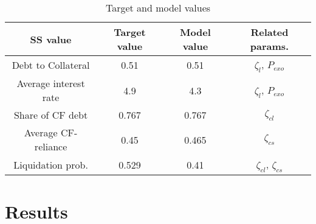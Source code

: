 \documentclass[12pt]{article}
\begin{document}
\begin{table}[h!]
    \centering
    \begin{tabular}{c|c|c|c}
    \toprule
    \textbf{SS value} & \textbf{Target value} & \textbf{Model value} & \textbf{Related params.} \\ 
    \midrule
    Debt to Collateral & 0.51 & 0.51 & $\zeta_l$, $P_{exo}$\\
    Average interest rate & 4.9 & 4.3 &  $\zeta_l$, $P_{exo}$  \\
    Share of CF debt & 0.767 & 0.767 &  $\zeta_{cl}$ \\
    Average CF-reliance & 0.45 & 0.465 &  $\zeta_{cs}$ \\
    Liquidation prob. & 0.529 & 0.41 & $\zeta_{cl}$, $\zeta_{cs}$ \\
        \bottomrule
    \end{tabular}
    \caption{Target and model values}
    \label{tab:targets}
\end{table}

\newpage

\section{Results}
 
\end{document}
